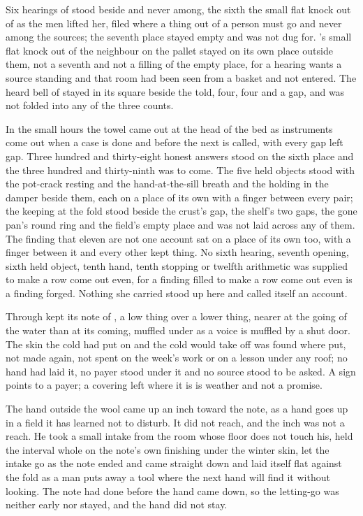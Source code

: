 Six hearings of  stood beside and never among, the sixth the small flat knock out of  as the men lifted her, filed where a thing out of a person must go and never among the sources; the seventh place stayed empty and was not dug for. 's small flat knock out of the neighbour on the pallet stayed on its own place outside them, not a seventh and not a filling of the empty place, for a hearing wants a source standing and that room had been seen from a basket and not entered. The heard bell of  stayed in its square beside the told, four, four and a gap, and was not folded into any of the three counts.

\scenebreak

In the small hours the towel came out at the head of the bed as instruments come out when a case is done and before the next is called, with every gap left gap. Three hundred and thirty-eight honest answers stood on the sixth place and the three hundred and thirty-ninth was to come. The five held objects stood with the pot-crack resting and the hand-at-the-sill breath and the holding in the damper beside them, each on a place of its own with a finger between every pair; the keeping at the fold stood beside the crust's gap, the shelf's two gaps, the gone pan's round ring and the field's empty place and was not laid across any of them. The finding that eleven are not one account sat on a place of its own too, with a finger between it and every other kept thing. No sixth hearing, seventh opening, sixth held object, tenth hand, tenth stopping or twelfth arithmetic was supplied to make a row come out even, for a finding filled to make a row come out even is a finding forged. Nothing she carried stood up here and called itself an account.

Through   kept its note of , a low thing over a lower thing, nearer at the going of the water than at its coming, muffled under  as a voice is muffled by a shut door. The skin the cold had put on and the cold would take off was found where put, not made again, not spent on the week's work or on a lesson under any roof; no hand had laid it, no payer stood under it and no source stood to be asked. A sign points to a payer; a covering left where it is is weather and not a promise.

The hand outside the wool came up an inch toward the note, as a hand goes up in a field it has learned not to disturb. It did not reach, and the inch was not a reach. He took a small intake from the room whose floor does not touch his, held the interval whole on the note's own finishing under the winter skin, let the intake go as the note ended and came straight down and laid itself flat against the fold as a man puts away a tool where the next hand will find it without looking. The note had done before the hand came down, so the letting-go was neither early nor stayed, and the hand did not stay.

